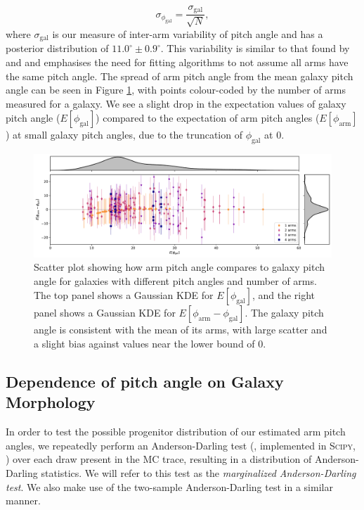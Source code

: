\begin{equation}
  \sigma_{\phi_\mathrm{gal}} = \frac{\sigma_\mathrm{gal}}{\sqrt{N}},
\end{equation}
where $\sigma_\mathrm{gal}$ is our measure of inter-arm variability of pitch angle and has a posterior distribution of $11.0^\circ\pm 0.9^\circ$. This variability is similar to that found by \citet{1981AJ.....86.1847K} and \citet{2014ApJ...790...87D} and emphasises the need for fitting algorithms to not assume all arms have the same pitch angle. The spread of arm pitch angle from the mean galaxy pitch angle can be seen in Figure \ref{fig:arm-pa-spread}, with points colour-coded by the number of arms measured for a galaxy. We see a slight drop in the expectation values of galaxy pitch angle ($E[\phi_\mathrm{gal}]$) compared to the expectation of arm pitch angles ($E[\phi_\mathrm{arm}]$) at small galaxy pitch angles, due to the truncation of $\phi_\mathrm{gal}$ at {0\degree}.

\begin{figure}
  \includegraphics[width=17.7cm]{plots/arm_pa_spread.pdf}
  \caption{Scatter plot showing how arm pitch angle compares to galaxy pitch angle for galaxies with different pitch angles and number of arms. The top panel shows a Gaussian KDE for $E[\phi_\mathrm{gal}]$, and the right panel shows a Gaussian KDE for $E[\phi_\mathrm{arm} - \phi_\mathrm{gal}]$. The galaxy pitch angle is consistent with the mean of its arms, with large scatter and a slight bias against values near the lower bound of $0$.}
  \label{fig:arm-pa-spread}
\end{figure}


\subsection{Dependence of pitch angle on Galaxy Morphology}
\label{section:morphology_comparision}

In order to test the possible progenitor distribution of our estimated arm pitch angles, we repeatedly perform an Anderson-Darling test (\citealt{10.2307/2286009}, implemented in \textsc{Scipy}, \citealt{scipy-paper}) over each draw present in the MC trace, resulting in a distribution of Anderson-Darling statistics. We will refer to this test as the \textit{marginalized Anderson-Darling test}. We also make use of the two-sample Anderson-Darling \citep{doi:10.1080/01621459.1987.10478517} test in a similar manner.

